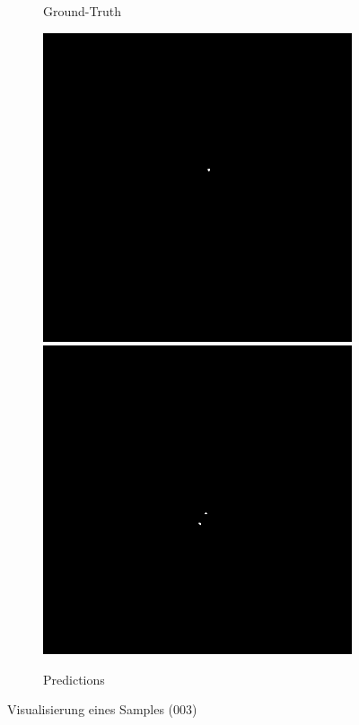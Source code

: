 \begin{figure}[H]
\begin{minipage}{0.3\textwidth}
\begin{subfigure}{\textwidth}
\caption{Ground-Truth}
\end{subfigure}
\end{minipage}%
\hspace{3mm}
\begin{minipage}{0.3\textwidth}
\begin{subfigure}{\textwidth}
\centering
\includegraphics[width=\textwidth]{Pictures/nnUnet/Praxis/Task109-CT/samples/pred/pred_CT_003-430.png}
\includegraphics[width=\textwidth]{Pictures/nnUnet/Praxis/Task109-CT/samples/pred/pred_CT_003-475.png}
\caption{Predictions}
\end{subfigure}
\end{minipage}%
\caption{Visualisierung eines Samples (003)}
\label{pic:Vis_109}
\end{figure}

